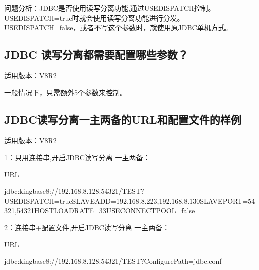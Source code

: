 \documentclass[a4,10pt,oneside,english]{sphinxmanual}
\begin{document}
问题分析：JDBC是否使用读写分离功能,通过USEDISPATCH控制。USEDISPATCH=true时就会使用读写分离功能进行分发。USEDISPATCH=false，或者不写这个参数时，就使用原JDBC单机方式。


\subsection{JDBC 读写分离都需要配置哪些参数？}
\label{\detokenize{interface/jdbc:id4}}
适用版本：V8R2

一般情况下，只需额外5个参数来控制。

\begin{sphinxVerbatim}[commandchars=\\\{\}]
\end{sphinxVerbatim}


\subsection{JDBC读写分离一主两备的URL和配置文件的样例}
\label{\detokenize{interface/jdbc:id5}}
适用版本：V8R2

1：只用连接串,开启JDBC读写分离 一主两备：

URL

\begin{sphinxVerbatim}[commandchars=\\\{\}]
jdbc:kingbase8://192.168.8.128:54321/TEST?USEDISPATCH=true\PYGZam{}SLAVE\PYGZus{}ADD=192.168.8.223,192.168.8.130\PYGZam{}SLAVE\PYGZus{}PORT=54321,54321\PYGZam{}HOSTLOADRATE=33\PYGZam{}USECONNECT\PYGZus{}POOL=false
\end{sphinxVerbatim}

2：连接串+配置文件,开启JDBC读写分离 一主两备：

URL

\begin{sphinxVerbatim}[commandchars=\\\{\}]
jdbc:kingbase8://192.168.8.128:54321/TEST?ConfigurePath=jdbc.conf
\end{sphinxVerbatim}
\end{document}
